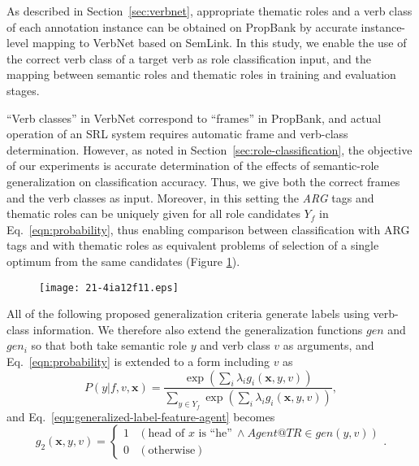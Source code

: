 \documentclass[english]{jnlp_1.4_rep}
\begin{document}
As described in Section~\ref{sec:verbnet}, appropriate thematic roles and a verb class of each annotation instance can be obtained on PropBank by accurate instance-level mapping to VerbNet based on SemLink. In this study, we enable the use of the correct verb class of a target verb as role classification input, and the mapping between semantic roles and thematic roles in training and evaluation stages.

``Verb classes'' in VerbNet correspond to ``frames'' in PropBank, and actual operation of an SRL system requires automatic frame and verb-class determination. However, as noted in Section~\ref{sec:role-classification}, the objective of our experiments is accurate determination of the effects of semantic-role generalization on classification accuracy. Thus, we give both the correct frames and the verb classes as input. Moreover, in this setting the {\it ARG} tags and thematic roles can be uniquely given for all role candidates $Y_f$ in Eq.~\ref{eqn:probability}, thus enabling comparison between classification with ARG tags and with thematic roles as equivalent problems of selection of a single optimum from the same candidates (Figure \ref{fig:arg-thematic-mapping}).


\begin{figure}[b]
\begin{center}
\texttt{[image: 21-4ia12f11.eps]}
\end{center}
\renewcommand{\baselinestretch}{}
\label{fig:arg-thematic-mapping}
\end{figure}

All of the following proposed generalization criteria generate labels using verb-class information. We therefore also extend the generalization functions $gen$ and $gen_{i}$ so that both take semantic role $y$ and verb class $v$ as arguments, and Eq.~\ref{eqn:probability} is extended to a form including $v$ as
\begin{equation}
P(y|f,v,\mathbf{x}) =
  \frac{\exp(\sum_{i}\lambda_{i}g_i(\mathbf{x},y,v))}{\sum_{y\in Y_f}\exp(\sum_{i}\lambda_{i}g_i(\mathbf{x},y,v))},
\label{eqn:probability2}
\end{equation}
and Eq.~\ref{equ:generalized-label-feature-agent} becomes
\begin{equation}
 g_2(\mathbf{x},y,v) =
  \begin{cases}
   1 & (\mbox{head of }x\mbox{ is ``he''}~\wedge \mathit{Agent@TR} \in \mathit{gen}(y,v))\\
   0 & (\mbox{otherwise})
  \end{cases}.
\end{equation}
\end{document}

